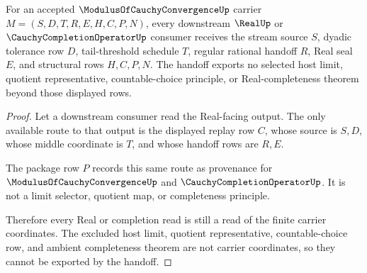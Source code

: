 \begin{theorem}
\label{thm:modulus-of-cauchy-convergence-real-handoff}
For an accepted $\ModulusOfCauchyConvergenceUp$ carrier $M=(S,D,T,R,E,H,C,P,N)$, every downstream $\RealUp$ or $\CauchyCompletionOperatorUp$ consumer receives the stream source $S$, dyadic tolerance row $D$, tail-threshold schedule $T$, regular rational handoff $R$, Real seal $E$, and structural rows $H,C,P,N$. The handoff exports no selected host limit, quotient representative, countable-choice principle, or Real-completeness theorem beyond those displayed rows.
\end{theorem}
\begin{proof}
Let a downstream consumer read the Real-facing output. The only available route to that output is the displayed replay row $C$, whose source is $S,D$, whose middle coordinate is $T$, and whose handoff rows are $R,E$.

The package row $P$ records this same route as provenance for $\ModulusOfCauchyConvergenceUp$ and $\CauchyCompletionOperatorUp$. It is not a limit selector, quotient map, or completeness principle.

Therefore every Real or completion read is still a read of the finite carrier coordinates. The excluded host limit, quotient representative, countable-choice row, and ambient completeness theorem are not carrier coordinates, so they cannot be exported by the handoff.
\end{proof}


\begin{closurestatus}{\ModulusOfCauchyConvergenceUp}
  \theoryclosure{\seedClosure}
  \formalstatus{\unformalizedV}
\end{closurestatus}
